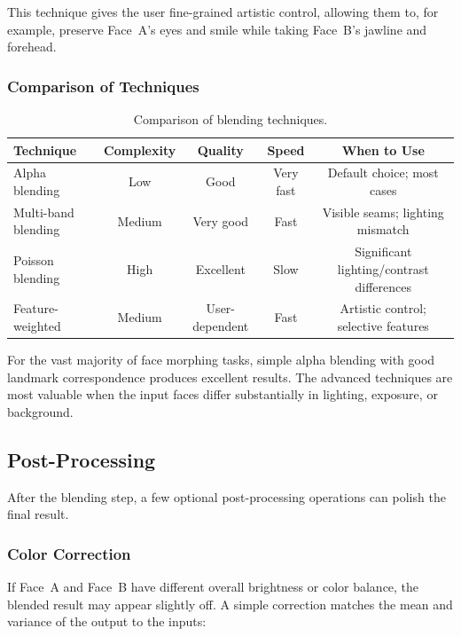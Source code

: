 This technique gives the user fine-grained artistic control, allowing them to, for example,
preserve Face~A's eyes and smile while taking Face~B's jawline and forehead.

\subsubsection{Comparison of Techniques}

\begin{table}[htbp]
\centering
\caption{Comparison of blending techniques.}
\label{tab:blending-comparison}
\begin{tabular}{@{}lcccc@{}}
\toprule
\textbf{Technique} & \textbf{Complexity} & \textbf{Quality} & \textbf{Speed} & \textbf{When to Use} \\
\midrule
Alpha blending & Low & Good & Very fast & Default choice; most cases \\
Multi-band blending & Medium & Very good & Fast & Visible seams; lighting mismatch \\
Poisson blending & High & Excellent & Slow & Significant lighting/contrast differences \\
Feature-weighted & Medium & User-dependent & Fast & Artistic control; selective features \\
\bottomrule
\end{tabular}
\end{table}

For the vast majority of face morphing tasks, simple alpha blending with good landmark
correspondence produces excellent results. The advanced techniques are most valuable when
the input faces differ substantially in lighting, exposure, or background.

\subsection{Post-Processing}

After the blending step, a few optional post-processing operations can polish the final result.

\subsubsection{Color Correction}

If Face~A and Face~B have different overall brightness or color balance, the blended result may
appear slightly off. A simple correction matches the mean and variance of the output to the
inputs:

